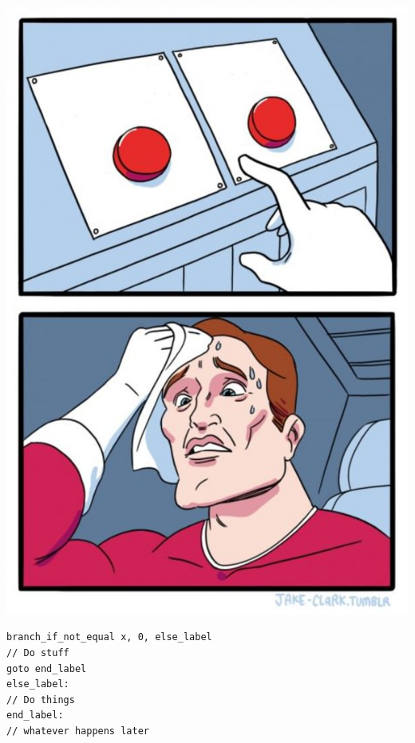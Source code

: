 \begin{frame}[fragile]
\begin{minipage}{.4\textwidth}
\begin{center}
	\includegraphics[width= \textwidth]{images/Two-Buttons.jpg}
\end{center}
\end{minipage}
\hspace*{2em} \begin{minipage}{.4\textwidth} \begin{lstlisting}
branch_if_not_equal x, 0, else_label
// Do stuff
goto end_label
else_label:
// Do things
end_label:
// whatever happens later
\end{lstlisting}
\end{minipage}

\end{frame}



